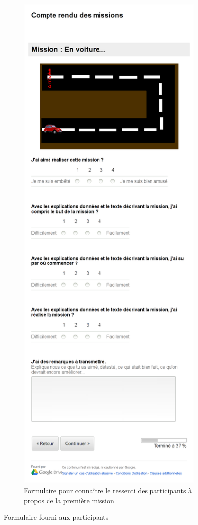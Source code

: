 \begin{figure}
\begin{center}
\begin{subfigure}[b]{.49\textwidth}
      \includegraphics[width=\textwidth]{content/8-validation/images/form-car}
      \caption{Formulaire pour connaître le ressenti des participants à propos de la première mission}
    \end{subfigure}
    \caption{Formulaire fourni aux participants}
    \label{fig:form-user}
  \end{center}
\end{figure}

